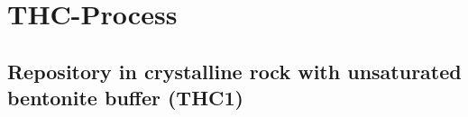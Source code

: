 \chapter{THC-Process}



\section[Repository in crystalline rock with unsat.bentonite buffer]{Repository in crystalline rock with unsaturated bentonite buffer (THC1)}
\label{sec:thc-decovalex}

 